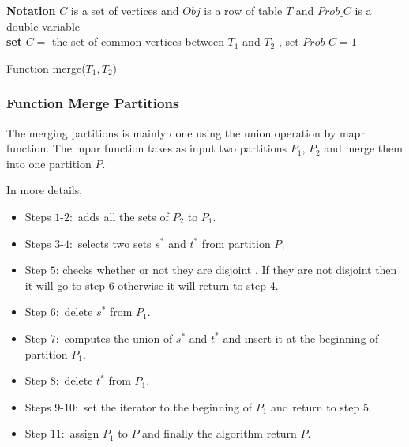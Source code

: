 \documentclass[11pt]{article}
\begin{document}
\begin{algorithm}[H]
\Indm  
{}

\textbf{Notation} $C$ is a set of vertices and $Obj$ is a row of table $T$ and $Prob\_C$ is a double variable\\
\Indp
\nl \textbf{set} $C=$ the set of common vertices between $T_1$ and $T_2$ , set $Prob\_C=1$\\
 \nl {}
\nl {}

 \caption{Function merge($T_1,T_2$)}
\end{algorithm}

\subsubsection{Function Merge Partitions }
 The merging partitions is mainly done using the union operation by mapr function. The mpar function takes as input two partitions $P_1$, $P_2$ and merge them into one partition $P$.

In more details,  
\begin{itemize}[noitemsep,nolistsep]
\item Steps $1$-$2:$ adds all the sets of $P_2$ to $P_1$.
\item Steps $3$-$4:$ selects two sets $s^*$ and $t^*$ from partition $P_1$ 
\item Step $5$: checks whether or not they are disjoint . If they are  not disjoint then it will go to step 6 otherwise it will return to step 4.
\item Step $6:$ delete $s^*$ from $P_1$.
\item Step $7:$ computes the union of $s^*$ and $t^*$ and insert it at the beginning of partition $P_1$.
\item Step $8:$ delete $t^*$ from $P_1$.
\item Steps $9$-$10:$ set the iterator to the beginning of $P_1$ and return to step 5.
\item Step $11:$ assign $P_1$ to $P$ and finally the algorithm return $P$.
\end{itemize}
\end{document}
